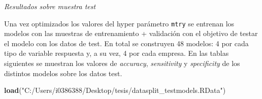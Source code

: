 \documentclass[]{article}
\newenvironment{Shaded}{\begin{snugshade}}{\end{snugshade}}
\newcommand{\KeywordTok}[1]{\textcolor[rgb]{0.13,0.29,0.53}{\textbf{#1}}}
\newcommand{\StringTok}[1]{\textcolor[rgb]{0.31,0.60,0.02}{#1}}
\newcommand{\NormalTok}[1]{#1}
\begin{document}
\emph{Resultados sobre muestra test}

Una vez optimizados los valores del hyper parámetro \texttt{mtry} se
entrenan los modelos con las muestras de entrenamiento + validación con
el objetivo de testar el modelo con los datos de test. En total se
construyen 48 modelos: 4 por cada tipo de variable respuesta y, a su
vez, 4 por cada empresa. En las tablas siguientes se muestran los
valores de \emph{accuracy}, \emph{sensitivity} y \emph{specificity} de
los distintos modelos sobre los datos test.

\begin{Shaded}
\begin{Highlighting}[]
\KeywordTok{load}\NormalTok{(}\StringTok{"C:/Users/i0386388/Desktop/tesis/datasplit_testmodels.RData"}\NormalTok{)}
\end{Highlighting}
\end{Shaded}
\end{document}
